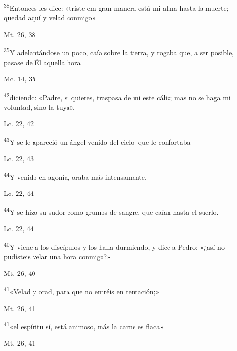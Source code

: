 \documentclass[a4paper,11pt]{article}
\begin{document}
      \textsuperscript{38}Entonces les dice: «triste em gran manera está mi alma hasta la muerte; quedad aquí y velad conmigo»
      \begin{flushright}
        Mt. 26, 38
      \end{flushright}

      \textsuperscript{35}Y adelantándose un poco, caía sobre la tierra, y rogaba que, a ser posible, pasase de Él aquella hora
      \begin{flushright}
        Mc. 14, 35  
      \end{flushright}

      \textsuperscript{42}diciendo: «Padre, si quieres, traspasa de mi este cáliz; mas no se haga mi voluntad, sino la tuya».
      \begin{flushright}
        Lc. 22, 42
      \end{flushright}

      \textsuperscript{43}Y se le apareció un ángel venido del cielo, que le confortaba
      \begin{flushright}
        Lc. 22, 43
      \end{flushright}

      \textsuperscript{44}Y venido en agonía, oraba más intensamente. 
      \begin{flushright}
        Lc. 22, 44
      \end{flushright}

      \textsuperscript{44}Y se hizo su sudor como grumos de sangre, que caían hasta el suerlo.
      \begin{flushright}
        Lc. 22, 44
      \end{flushright}

      \textsuperscript{40}Y viene a los discípulos y los halla durmiendo, y dice a Pedro: «¿así no pudísteis velar una hora conmigo?»
      \begin{flushright}
        Mt. 26, 40
      \end{flushright}

      \textsuperscript{41}«Velad y orad, para que no entréis en tentación;»
      \begin{flushright}
        Mt. 26, 41
      \end{flushright}

      \textsuperscript{41}«el espíritu sí, está animoso, más la carne es flaca»
      \begin{flushright}
        Mt. 26, 41
      \end{flushright}
\end{document}
